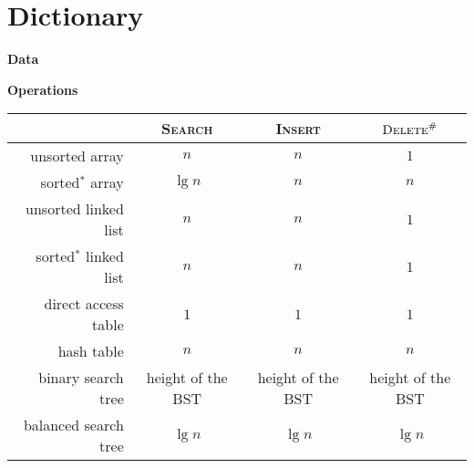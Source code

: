 \chapter{Dictionary}

\begin{minipage}[t]{0.45\linewidth}
    \textbf{Data}

\end{minipage}
\begin{minipage}[t]{0.45\linewidth}
    \textbf{Operations}

\end{minipage}

\begin{table}[H]
    \centering
    \begin{tabular}{r | c c c}                                                                   \hline
                               & \textsc{Search}   & \textsc{Insert}   & $\textsc{Delete}^\#$ \\ \hline
        unsorted array         & $n$               & $n$               & $1$                  \\
        sorted$^*$ array       & $\lg n$           & $n$               & $n$                  \\
        unsorted linked list   & $n$               & $n$               & $1$                  \\
        sorted$^*$ linked list & $n$               & $n$               & $1$                  \\ \hline
        direct access table    & $1$               & $1$               & $1$                  \\
        hash table             & $n$               & $n$               & $n$                  \\ \hline
        binary search tree     & height of the BST & height of the BST & height of the BST    \\
        balanced search tree   & $\lg n$           & $\lg n$           & $\lg n$              \\ \hline
    \end{tabular}
\end{table}



